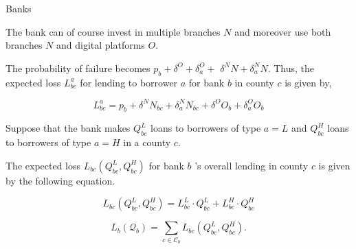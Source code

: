 \documentclass[notes,10pt, aspectratio=169]{beamer}
\newenvironment{wideitemize}{\itemize\addtolength{\itemsep}{10pt}}{\enditemize}
\begin{document}
\begin{frame}{Banks}


    \begin{wideitemize}
        \item The bank can of course invest in multiple branches $N$ and moreover use both branches $N$ and digital platforms $O$. 
        \item The probability of failure becomes $p_b+\delta^O+\delta_a^O+$ $\delta^N N+\delta_a^N N$. Thus, the expected loss $L_{b c}^a$ for lending to borrower $a$ for bank $b$ in county $c$ is given by,

        $$
        L_{b c}^a=p_b+\delta^N N_{b c}+\delta_a^N N_{b c}+\delta^O O_b+\delta_a^O O_b
        $$
        
        
        \item Suppose that the bank makes $Q_{b c}^L$ loans to borrowers of type $a=L$ and $Q_{b c}^H$ loans to borrowers of type $a=H$ in a county $c$. 
        
        \item The expected loss $L_{b c}\left(Q_{b c}^L, Q_{b c}^H\right)$ for bank $b$ 's overall lending in county $c$ is given by the following equation.
        
        $$
        L_{b c}\left(Q_{b c}^L, Q_{b c}^H\right)=L_{b c}^L \cdot Q_{b c}^L+L_{b c}^H \cdot Q_{b c}^H
        $$
        
        
        
        $$
        L_b\left(\mathcal{Q}_b\right)=\sum_{c \in \mathcal{C}_b} L_{b c}\left(Q_{b c}^L, Q_{b c}^H\right) .
        $$
        
    \end{wideitemize}


\end{frame}
\end{document}
